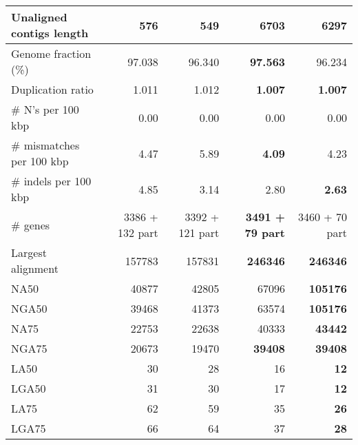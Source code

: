 \documentclass[12pt,a4paper]{article}
\begin{document}
\begin{table}[ht]
\begin{center}
\begin{tabular}{|l*{4}{|r}|}
Unaligned contigs length & 576 & {\bf 549} & 6703 & 6297 \\ \hline
Genome fraction (\%) & 97.038 & 96.340 & {\bf 97.563} & 96.234 \\ \hline
Duplication ratio & 1.011 & 1.012 & {\bf 1.007} & {\bf 1.007} \\ \hline
\# N's per 100 kbp & 0.00 & 0.00 & 0.00 & 0.00 \\ \hline
\# mismatches per 100 kbp & 4.47 & 5.89 & {\bf 4.09} & 4.23 \\ \hline
\# indels per 100 kbp & 4.85 & 3.14 & 2.80 & {\bf 2.63} \\ \hline
\# genes & 3386 + 132 part & 3392 + 121 part & {\bf 3491 + 79 part} & 3460 + 70 part \\ \hline
Largest alignment & 157783 & 157831 & {\bf 246346} & {\bf 246346} \\ \hline
NA50 & 40877 & 42805 & 67096 & {\bf 105176} \\ \hline
NGA50 & 39468 & 41373 & 63574 & {\bf 105176} \\ \hline
NA75 & 22753 & 22638 & 40333 & {\bf 43442} \\ \hline
NGA75 & 20673 & 19470 & {\bf 39408} & {\bf 39408} \\ \hline
LA50 & 30 & 28 & 16 & {\bf 12} \\ \hline
LGA50 & 31 & 30 & 17 & {\bf 12} \\ \hline
LA75 & 62 & 59 & 35 & {\bf 26} \\ \hline
LGA75 & 66 & 64 & 37 & {\bf 28} \\ \hline
\end{tabular}
\end{center}
\end{table}
\end{document}
